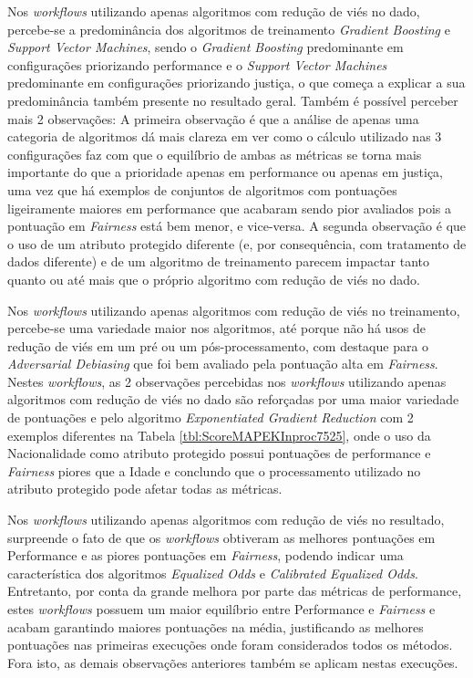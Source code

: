 \documentclass[twocolumn]{article}
\begin{document}
Nos \textit{workflows} utilizando apenas algoritmos com redução de viés no dado, percebe-se a predominância dos algoritmos de treinamento \textit{Gradient Boosting} e \textit{Support Vector Machines}, sendo o \textit{Gradient Boosting} predominante em configurações priorizando performance e o \textit{Support Vector Machines} predominante em configurações priorizando justiça, o que começa a explicar a sua predominância também presente no resultado geral. Também é possível perceber mais 2 observações: A primeira observação é que a análise de apenas uma categoria de algoritmos dá mais clareza em ver como o cálculo utilizado nas 3 configurações faz com que o equilíbrio de ambas as métricas se torna mais importante do que a prioridade apenas em performance ou apenas em justiça, uma vez que há exemplos de conjuntos de algoritmos com pontuações ligeiramente maiores em performance que acabaram sendo pior avaliados pois a pontuação em \textit{Fairness} está bem menor, e vice-versa. A segunda observação é que o uso de um atributo protegido diferente (e, por consequência, com tratamento de dados diferente) e de um algoritmo de treinamento parecem impactar tanto quanto ou até mais que o próprio algoritmo com redução de viés no dado.

Nos \textit{workflows} utilizando apenas algoritmos com redução de viés no treinamento, percebe-se uma variedade maior nos algoritmos, até porque não há usos de redução de viés em um pré ou um pós-processamento, com destaque para o \textit{Adversarial Debiasing} que foi bem avaliado pela pontuação alta em \textit{Fairness}. Nestes \textit{workflows}, as 2 observações percebidas nos \textit{workflows} utilizando apenas algoritmos com redução de viés no dado são reforçadas por uma maior variedade de pontuações e pelo algoritmo \textit{Exponentiated Gradient Reduction} com 2 exemplos diferentes na Tabela \ref{tbl:ScoreMAPEKInproc7525}, onde o uso da Nacionalidade como atributo protegido possui pontuações de performance e \textit{Fairness} piores que a Idade e conclundo que o processamento utilizado no atributo protegido pode afetar todas as métricas.

Nos \textit{workflows} utilizando apenas algoritmos com redução de viés no resultado, surpreende o fato de que os \textit{workflows} obtiveram as melhores pontuações em Performance e as piores pontuações em \textit{Fairness}, podendo indicar uma característica dos algoritmos \textit{Equalized Odds} e \textit{Calibrated Equalized Odds}. Entretanto, por conta da grande melhora por parte das métricas de performance, estes \textit{workflows} possuem um maior equilíbrio entre Performance e \textit{Fairness} e acabam garantindo maiores pontuações na média, justificando as melhores pontuações nas primeiras execuções onde foram considerados todos os métodos. Fora isto, as demais observações anteriores também se aplicam nestas execuções.
\end{document}
